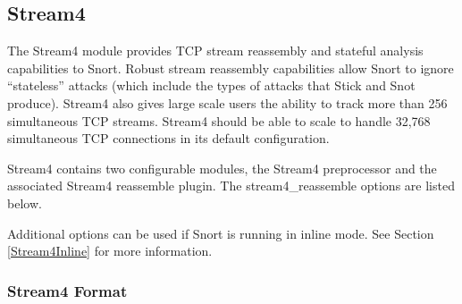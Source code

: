 \documentclass[english]{report}
\newenvironment{note}{
\samepage
    \vspace{10pt}{\textsf{
        {\hspace{7pt}\Huge{$\triangle$\hspace{-12.5pt}{\Large{$^!$}}}}\hspace{5pt}
        {\Large{NOTE}}
    }
    }
   \begin{center}
    \par\vspace{-17pt}

    \begin{lrbox}{\savepar}
    \begin{minipage}[r]{6in}
}
{
    \end{minipage}
    \end{lrbox}
    \fbox{
        \usebox{
            \savepar
        }
    }
    \par\vskip10pt
    \end{center}
}
\begin{document}
\subsection{Stream4\label{stream 4 section}}

The Stream4 module provides TCP stream reassembly and stateful analysis
capabilities to Snort. Robust stream reassembly capabilities allow
Snort to ignore ``stateless'' attacks (which include the types of attacks
that Stick and Snot produce).
Stream4 also gives large scale users the ability to track more than
256 simultaneous TCP streams. Stream4 should be able to scale to handle
32,768 simultaneous TCP connections in its default configuration.

Stream4 contains two configurable modules, the Stream4 preprocessor
and the associated Stream4 reassemble plugin. The stream4\_reassemble
options are listed below. 

\begin{note}
Additional options can be used if Snort is running in inline mode. See Section
\ref{Stream4Inline} for more information.
\end{note}


\subsubsection{Stream4 Format}
\end{document}
